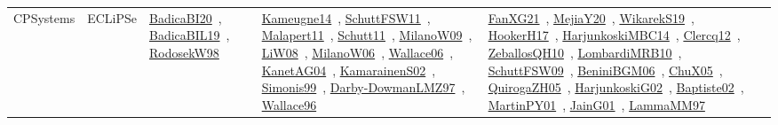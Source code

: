 {\begin{longtable}{lp{3cm}>{\raggedright\arraybackslash}p{6cm}>{\raggedright\arraybackslash}p{6cm}>{\raggedright\arraybackslash}p{8cm}}
CPSystems & ECLiPSe & \href{../works/BadicaBI20.pdf}{BadicaBI20}~\cite{BadicaBI20}, \href{../works/BadicaBIL19.pdf}{BadicaBIL19}~\cite{BadicaBIL19}, \href{../works/RodosekW98.pdf}{RodosekW98}~\cite{RodosekW98} & \href{../works/Kameugne14.pdf}{Kameugne14}~\cite{Kameugne14}, \href{../works/SchuttFSW11.pdf}{SchuttFSW11}~\cite{SchuttFSW11}, \href{../works/Malapert11.pdf}{Malapert11}~\cite{Malapert11}, \href{../works/Schutt11.pdf}{Schutt11}~\cite{Schutt11}, \href{../works/MilanoW09.pdf}{MilanoW09}~\cite{MilanoW09}, \href{../works/LiW08.pdf}{LiW08}~\cite{LiW08}, \href{../works/MilanoW06.pdf}{MilanoW06}~\cite{MilanoW06}, \href{../works/Wallace06.pdf}{Wallace06}~\cite{Wallace06}, \href{../works/KanetAG04.pdf}{KanetAG04}~\cite{KanetAG04}, \href{../works/KamarainenS02.pdf}{KamarainenS02}~\cite{KamarainenS02}, \href{../works/Simonis99.pdf}{Simonis99}~\cite{Simonis99}, \href{../works/Darby-DowmanLMZ97.pdf}{Darby-DowmanLMZ97}~\cite{Darby-DowmanLMZ97}, \href{../works/Wallace96.pdf}{Wallace96}~\cite{Wallace96} & \href{../works/FanXG21.pdf}{FanXG21}~\cite{FanXG21}, \href{../works/MejiaY20.pdf}{MejiaY20}~\cite{MejiaY20}, \href{../works/WikarekS19.pdf}{WikarekS19}~\cite{WikarekS19}, \href{../works/HookerH17.pdf}{HookerH17}~\cite{HookerH17}, \href{../works/HarjunkoskiMBC14.pdf}{HarjunkoskiMBC14}~\cite{HarjunkoskiMBC14}, \href{../works/Clercq12.pdf}{Clercq12}~\cite{Clercq12}, \href{../works/ZeballosQH10.pdf}{ZeballosQH10}~\cite{ZeballosQH10}, \href{../works/LombardiMRB10.pdf}{LombardiMRB10}~\cite{LombardiMRB10}, \href{../works/SchuttFSW09.pdf}{SchuttFSW09}~\cite{SchuttFSW09}, \href{../works/BeniniBGM06.pdf}{BeniniBGM06}~\cite{BeniniBGM06}, \href{../works/ChuX05.pdf}{ChuX05}~\cite{ChuX05}, \href{../works/QuirogaZH05.pdf}{QuirogaZH05}~\cite{QuirogaZH05}, \href{../works/HarjunkoskiG02.pdf}{HarjunkoskiG02}~\cite{HarjunkoskiG02}, \href{../works/Baptiste02.pdf}{Baptiste02}~\cite{Baptiste02}, \href{../works/MartinPY01.pdf}{MartinPY01}~\cite{MartinPY01}, \href{../works/JainG01.pdf}{JainG01}~\cite{JainG01}, \href{../works/LammaMM97.pdf}{LammaMM97}~\cite{LammaMM97}\\

\end{longtable}}
